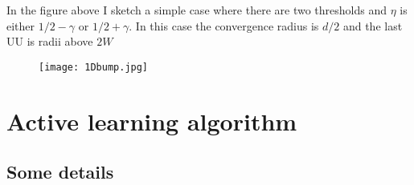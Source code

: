 \documentclass{article}
\begin{document}
In the figure above I sketch a simple case where there are two thresholds and $\eta$ is either $1/2-\gamma$ or $1/2+\gamma$. In this case the convergence radius is $d/2$ and the last UU is radii above $2W$

\begin{figure}[t]
\begin{center}
\texttt{[image: 1Dbump.jpg]}
\end{center}
\label{fig:cases}
\end{figure}

\section{Active learning algorithm}

\subsection{Some details}
\end{document}
